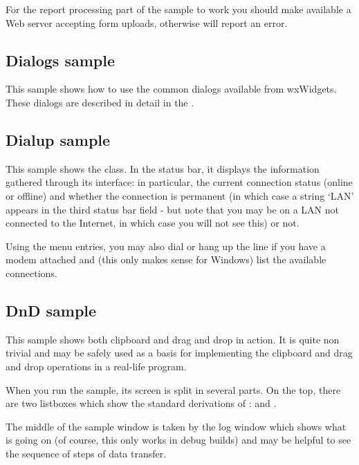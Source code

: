 For the report processing part of the sample to work you should make available
a Web server accepting form uploads, otherwise
 will report an error.


\subsection{Dialogs sample}\label{sampledialogs}

This sample shows how to use the common dialogs available from wxWidgets. These
dialogs are described in detail in the .


\subsection{Dialup sample}\label{sampledialup}

This sample shows the 
class. In the status bar, it displays the information gathered through its
interface: in particular, the current connection status (online or offline) and
whether the connection is permanent (in which case a string `LAN' appears in
the third status bar field - but note that you may be on a LAN not
connected to the Internet, in which case you will not see this) or not.

Using the menu entries, you may also dial or hang up the line if you have a
modem attached and (this only makes sense for Windows) list the available
connections.


\subsection{DnD sample}\label{samplednd}

This sample shows both clipboard and drag and drop in action. It is quite non
trivial and may be safely used as a basis for implementing the clipboard and
drag and drop operations in a real-life program.

When you run the sample, its screen is split in several parts. On the top,
there are two listboxes which show the standard derivations of
:
 and
.

The middle of the sample window is taken by the log window which shows what is
going on (of course, this only works in debug builds) and may be helpful to see
the sequence of steps of data transfer.

